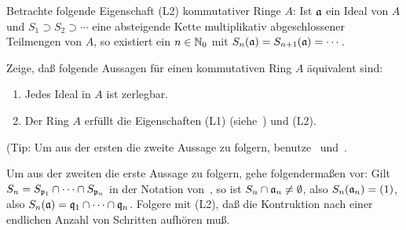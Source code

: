 \begin{exercise}
	Betrachte folgende Eigenschaft (L2) kommutativer Ringe \(A\): Ist
	\(\mathfrak{a}\) ein Ideal von \(A\) und \(S_1 \supset S_2 \supset \dotsb\)
	eine absteigende Kette multiplikativ abgeschlossener Teilmengen von \(A\),
	so existiert ein \(n \in \mathbb N_0\) mit
	\(S_n(\mathfrak{a}) = S_{n + 1}(\mathfrak{a}) = \dotsb\).
	
	Zeige, daß folgende Aussagen für einen kommutativen Ring \(A\)
	äquivalent sind:
	\begin{enumerate}
	\item
		Jedes Ideal in \(A\) ist zerlegbar.
	\item
		Der Ring \(A\) erfüllt die Eigenschaften (L1)
		(siehe~) und (L2).
	\end{enumerate}
	
	(Tip: Um aus der ersten die zweite Aussage zu folgern,
	benutze~
	und~.
	
	Um aus der zweiten die erste Aussage zu folgern, gehe folgendermaßen vor:
	Gilt \(S_n = S_{\mathfrak{p}_1} \cap \dotsb \cap S_{\mathfrak{p}_n}\) in der
	Notation von~, so ist \(S_n \cap \mathfrak{a}_n \neq
	\emptyset\), also \(S_n(\mathfrak{a}_n) = (1)\), also
	\(S_n(\mathfrak{a}) = \mathfrak{q}_1 \cap \dotsb \cap \mathfrak{q}_n\).
	Folgere mit (L2), daß die Kontruktion nach einer endlichen Anzahl von
	Schritten aufhören muß.
\end{exercise}

